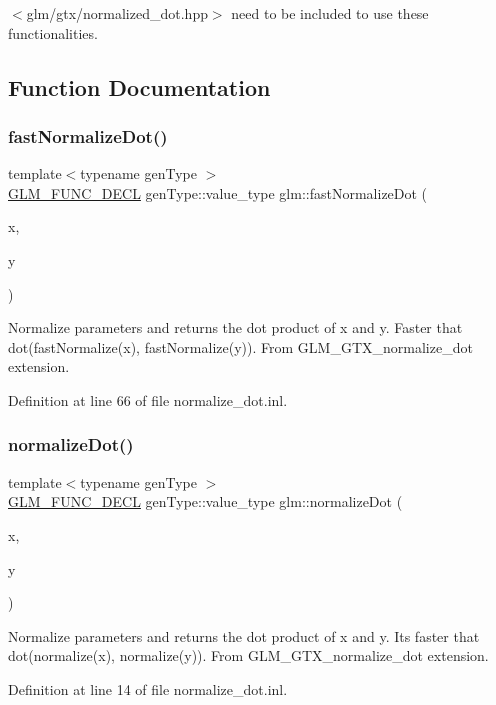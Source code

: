 $<$glm/gtx/normalized\+\_\+dot.\+hpp$>$ need to be included to use these functionalities. 

\subsection{Function Documentation}
\mbox{\label{group__gtx__normalize__dot_gaeb26ec35a51c30dbd0d91f9da45eeafe}} 
\subsubsection{\texorpdfstring{fast\+Normalize\+Dot()}{fastNormalizeDot()}}
{\footnotesize\ttfamily template$<$typename gen\+Type $>$ \\
\hyperlink{setup_8hpp_ab2d052de21a70539923e9bcbf6e83a51}{G\+L\+M\+\_\+\+F\+U\+N\+C\+\_\+\+D\+E\+CL} gen\+Type\+::value\+\_\+type glm\+::fast\+Normalize\+Dot (\begin{DoxyParamCaption}\item[{gen\+Type const \&}]{x,  }\item[{gen\+Type const \&}]{y }\end{DoxyParamCaption})}

Normalize parameters and returns the dot product of x and y. Faster that dot(fast\+Normalize(x), fast\+Normalize(y)). From G\+L\+M\+\_\+\+G\+T\+X\+\_\+normalize\+\_\+dot extension. 

Definition at line 66 of file normalize\+\_\+dot.\+inl.

\mbox{\label{group__gtx__normalize__dot_ga13b81f0882c1811cb6c99a5864b9c152}} 
\subsubsection{\texorpdfstring{normalize\+Dot()}{normalizeDot()}}
{\footnotesize\ttfamily template$<$typename gen\+Type $>$ \\
\hyperlink{setup_8hpp_ab2d052de21a70539923e9bcbf6e83a51}{G\+L\+M\+\_\+\+F\+U\+N\+C\+\_\+\+D\+E\+CL} gen\+Type\+::value\+\_\+type glm\+::normalize\+Dot (\begin{DoxyParamCaption}\item[{gen\+Type const \&}]{x,  }\item[{gen\+Type const \&}]{y }\end{DoxyParamCaption})}

Normalize parameters and returns the dot product of x and y. It\textquotesingle{}s faster that dot(normalize(x), normalize(y)). From G\+L\+M\+\_\+\+G\+T\+X\+\_\+normalize\+\_\+dot extension. 

Definition at line 14 of file normalize\+\_\+dot.\+inl.


